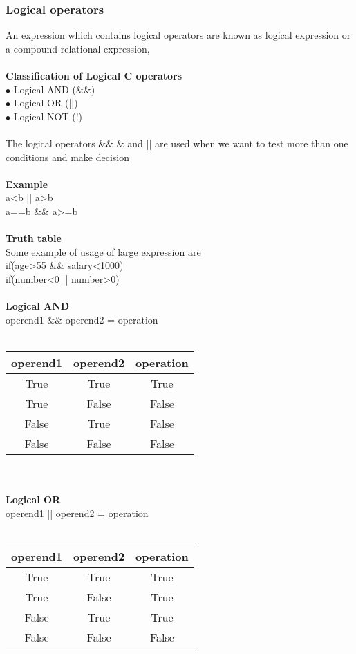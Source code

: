 \documentclass{article}
\begin{document}
	\subsubsection{Logical operators}
	An expression which contains logical operators are known as logical expression or a compound relational expression,
	\\ \\
	\textbf{Classification of Logical C operators} \\
	$\bullet$ Logical AND (\&\&) \\
	$\bullet$ Logical OR (||)\\
	$\bullet$ Logical NOT (!)
	\\ \\
	The logical operators \&\& \& and || are used when we want to test more than one conditions and make decision
	\\ \\
	\textbf{Example} \\
	a<b || a>b \\
	a==b \&\& a>=b
	\\ \\
	\textbf{Truth table} \\
	Some example of usage of large expression are \\
	if(age>55 \&\& salary<1000) \\
	if(number<0 || number>0)
	\\ \\
	\textbf{Logical AND}\\
	operend1 \&\& operend2 = operation
	\\ \\
	\begin{tabular}{|c|c|c|}
		\hline
		operend1 & operend2 & operation\\
		\hline
		True & True & True \\
		True & False & False \\
		False & True & False \\
		False & False & False \\
		\hline
	\end{tabular}
	\\ \\
	\textbf{Logical OR}\\
	operend1 || operend2 = operation
	\\ \\
	\begin{tabular}{|c|c|c|}
		\hline
		operend1 & operend2 & operation\\
		\hline
		True & True & True \\
		True & False & True \\
		False & True & True \\
		False & False & False \\
		\hline
	\end{tabular}
\end{document}
